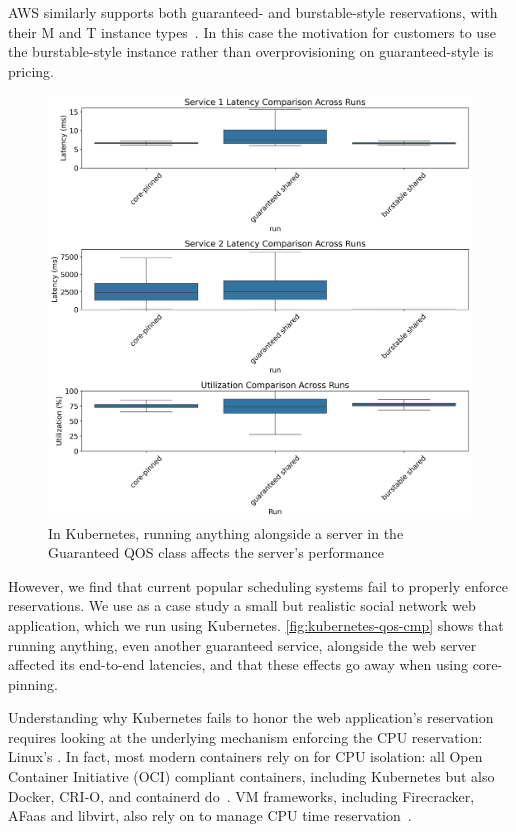 AWS similarly supports both guaranteed- and burstable-style reservations, with
their M and T instance types~\cite{aws-ec2-burstable,aws-ec2-resources}. In this
case the motivation for customers to use the burstable-style instance rather
than overprovisioning on guaranteed-style is pricing.


\begin{figure}[t]
    \centering
    \includegraphics[width=\columnwidth]{graphs/kubernetes-lc-lc-cmp.png}
    \caption{In Kubernetes, running anything alongside a server in the
    Guaranteed QOS class affects the server's
    performance}\label{fig:kubernetes-qos-cmp}
\end{figure}

However, we find that current popular scheduling systems fail to properly
enforce reservations. We use as a case study a small but realistic social
network web application, which we run using Kubernetes.
\autoref{fig:kubernetes-qos-cmp} shows that running anything, even another
guaranteed service, alongside the web server affected its end-to-end latencies,
and that these effects go away when using core-pinning.

Understanding why Kubernetes fails to honor the web application's reservation
requires looking at the underlying mechanism enforcing the CPU reservation:
Linux's \cgroups{}. In fact, most modern containers rely on \cgroups{} for CPU
isolation: all Open Container Initiative (OCI) compliant containers, including
Kubernetes but also Docker, CRI-O, and containerd
do~\cite{oci-cgroups,docker-docs-cgroups,container-isolation-article}. VM
frameworks, including Firecracker, AFaas and libvirt, also rely on \cgroups{} to
manage CPU time reservation~\cite{firecracker-cgroups,afaas,libvirt-cgroups}.

